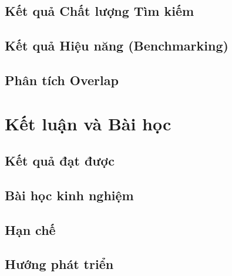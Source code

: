\documentclass[letterpaper,12pt]{report}
\begin{document}
\section{Kết quả Chất lượng Tìm kiếm}

\section{Kết quả Hiệu năng (Benchmarking)}

\section{Phân tích Overlap}

\chapter{Kết luận và Bài học}

\section{Kết quả đạt được}

\section{Bài học kinh nghiệm}

\section{Hạn chế}

\section{Hướng phát triển}



\end{document}
